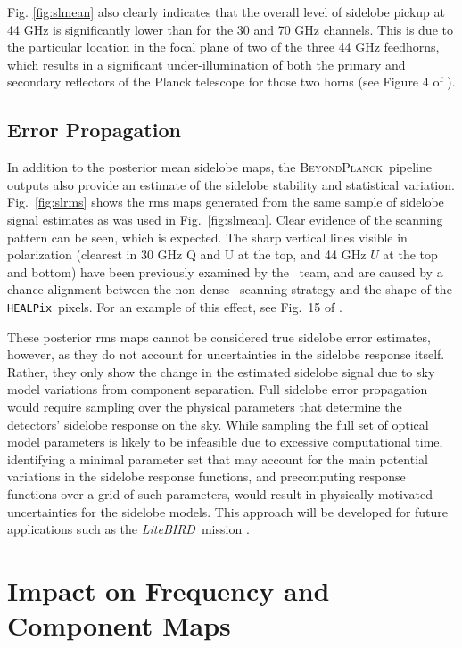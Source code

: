 \documentclass[twocolumn]{aa}
\def\LiteBIRD{\textit{LiteBIRD}}
\def\healpix{\texttt{HEALPix}}
\newcommand{\BP}{\textsc{BeyondPlanck}}
\begin{document}
Fig. \ref{fig:slmean} also clearly indicates that the overall level of sidelobe pickup at 44 GHz is significantly lower than for the 30 and 70 GHz channels. This is due to the particular location in the focal plane of two of the three 44 GHz feedhorns, which results in a significant under-illumination of both the primary and secondary reflectors of the Planck telescope for those two horns (see Figure 4 of \cite{sandri2010}).

\subsection{Error Propagation}

In addition to the posterior mean sidelobe maps, the \BP\ pipeline outputs also provide an estimate of the sidelobe stability and statistical variation. Fig.~\ref{fig:slrms} shows the rms maps generated from the same sample of sidelobe signal estimates as was used in Fig.~\ref{fig:slmean}. Clear evidence of the scanning pattern can be seen, which is expected. The sharp vertical lines visible in polarization (clearest in 30 GHz Q and U at the top, and 44 GHz $U$ at the top and bottom) have been previously examined by the \Planck\ team, and are caused by a chance alignment between the non-dense \Planck\ scanning strategy and the shape of the \healpix\ pixels. For an example of this effect, see Fig.~15 of \citet{planck2013-p03c}.

These posterior rms maps cannot be considered true sidelobe error estimates, however, as they do not account for uncertainties in the sidelobe response itself. Rather, they only show the change in the estimated sidelobe signal due to sky model variations from component separation. Full sidelobe error propagation would require sampling over the physical parameters that determine the detectors' sidelobe response on the sky. While sampling the full set of optical model parameters is likely to be infeasible due to excessive computational time, identifying a minimal parameter set that may account for the main potential variations in the sidelobe response functions, and precomputing response functions over a grid of such parameters, would result in physically motivated uncertainties for the sidelobe models. This approach will be developed for future applications such as the \LiteBIRD\ mission \citep{LiteBIRD}.

\section{Impact on Frequency and Component Maps}
\end{document}
